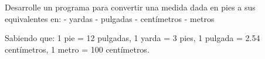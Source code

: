 Desarrolle un programa para convertir una medida dada en pies a sus equivalentes en:
- yardas
- pulgadas
- centímetros
- metros

Sabiendo que: 1 pie = 12 pulgadas, 1 yarda = 3 pies,  1 pulgada = 2.54 centímetros, 1 metro = 100 centímetros.

